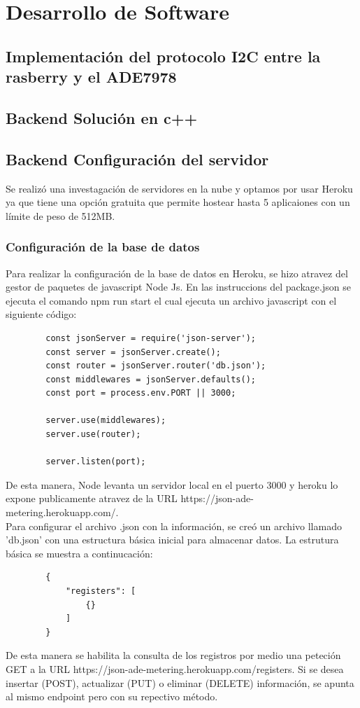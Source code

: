     \section{Desarrollo de Software}

    \subsection{Implementación del protocolo I2C entre la rasberry y el ADE7978}

    \subsection{Backend Solución en c++}
    \subsection{Backend Configuración del servidor}

    Se realizó una investagación de servidores en la nube y optamos por usar Heroku ya que tiene una opción gratuita que permite hostear hasta 5 aplicaiones con un límite de peso de 512MB. 

    \subsubsection{Configuración de la base de datos}
    
    Para realizar la configuración de la base de datos en Heroku, se hizo atravez del gestor de paquetes de javascript Node Js. En las instruccions del package.json se ejecuta el comando npm run start el cual ejecuta un archivo javascript con el siguiente código:

    \begin{lstlisting}
        const jsonServer = require('json-server');
        const server = jsonServer.create();
        const router = jsonServer.router('db.json');
        const middlewares = jsonServer.defaults();
        const port = process.env.PORT || 3000;

        server.use(middlewares);
        server.use(router);

        server.listen(port);
        \end{lstlisting}
    De esta manera, Node levanta un servidor local en el puerto 3000 y heroku lo expone publicamente atravez de la URL https://json-ade-metering.herokuapp.com/.\\

    Para configurar el archivo .json con la información, se creó un archivo llamado 'db.json' con una estructura básica inicial para almacenar datos. La estrutura básica se muestra a continucación:\\
    \begin{lstlisting}
        {
            "registers": [
                {}
            ]
        }
    \end{lstlisting}
    De esta manera se habilita la consulta de los registros por medio una peteción GET a la URL https://json-ade-metering.herokuapp.com/registers. Si se desea insertar (POST), actualizar (PUT) o eliminar (DELETE) información, se apunta al mismo endpoint pero con su repectivo método.

